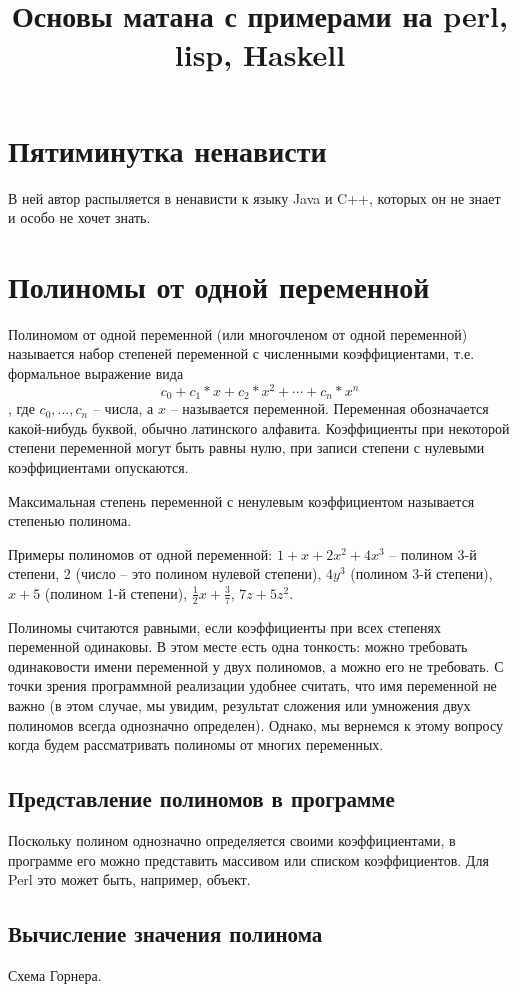 \documentclass{article}
\begin{document}
\title{Основы матана с примерами на perl, lisp, Haskell}
\maketitle
\section{Пятиминутка ненависти}
В ней автор распыляется в ненависти к языку Java и C++, которых он не знает и особо не хочет знать.
\section{Полиномы от одной переменной}
Полиномом от одной переменной (или многочленом от одной переменной) называется набор степеней переменной с численными коэффициентами, т.е. формальное выражение вида
$$c_0+c_1*x+c_2*x^2+\cdots+c_n*x^n$$, где $c_0,\dots, c_n$ -- числа, а $x$ -- называется переменной. 
Переменная обозначается какой-нибудь буквой, обычно латинского алфавита. Коэффициенты при некоторой степени переменной могут быть равны нулю, при записи степени с нулевыми коэффициентами опускаются. 

Максимальная степень переменной с ненулевым коэффициентом называется степенью полинома.

Примеры полиномов от одной переменной:
 $1+x+2 x^2+4 x^3$ -- полином 3-й степени, $2$ (число -- это полином нулевой степени), $4y^3$ (полином 3-й степени), $x+5$ (полином 1-й степени), $\frac{1}{2}x+\frac{3}{7}$,
$7 z +5 z^2$. 

Полиномы считаются равными, если  коэффициенты при всех степенях переменной одинаковы. В этом месте есть одна тонкость: можно требовать одинаковости имени переменной у двух полиномов, а можно его не требовать. С точки зрения программной реализации удобнее считать, что имя переменной не важно (в этом случае, мы увидим, результат сложения или умножения двух полиномов всегда однозначно определен). Однако, мы вернемся к этому вопросу когда будем рассматривать полиномы от многих переменных. 
\subsection{Представление полиномов в программе}
Поскольку полином однозначно определяется своими коэффициентами, в программе его можно представить массивом или списком коэффициентов.  Для Perl это может быть, например, объект.
\subsection{Вычисление значения полинома}
Схема Горнера.
\end{document}
